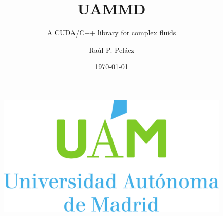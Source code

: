 \documentclass[xcolor=dvipsnames, compress]{beamer}
\title{UAMMD}
\subtitle{A CUDA/C++ library for complex fluids}
\author{Raúl P. Peláez}
\institute{Universidad Autónoma de Madrid}
\date{\today}
\begin{document}
\begin{frame}
  \titlepage
  \centering
  \begin{figure}
    \centering
    \includegraphics[width=0.25\linewidth]{UAMlogo}
  \end{figure}
\end{frame}

%
%
%
\end{document}
